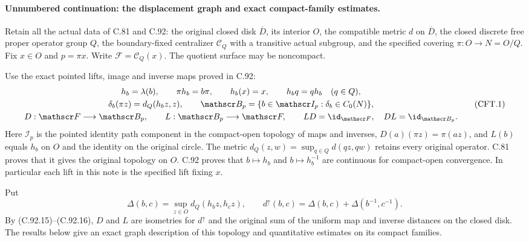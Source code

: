 \paragraph{Unnumbered continuation: the displacement graph and exact compact-family estimates.}
Retain all the actual data of C.81 and C.92: the original closed disk
$\overline D$, its interior $O$, the compatible metric $d$ on
$\overline D$, the closed discrete free proper operator group $Q$,
the boundary-fixed centralizer $\mathscr C_Q$ with a transitive actual
subgroup, and the specified covering $\pi:O\to N=O/Q$.
Fix $x\in O$ and $p=\pi x$. Write $\mathscr F=\mathscr C_Q(x)$.
The quotient surface may be noncompact.

Use the exact pointed lifts, image and inverse maps proved in C.92:
\[
\begin{gathered}
 h_b=\lambda(b),\qquad \pi h_b=b\pi,\qquad h_b(x)=x,
 \qquad h_bq=qh_b\quad(q\in Q),\\
 \delta_b(\pi z)=d_Q(h_bz,z),\qquad
 \mathscr B_p=\{b\in\mathscr I_p:\delta_b\in C_0(N)\},\\
 D:\mathscr F\longrightarrow\mathscr B_p,\qquad
 L:\mathscr B_p\longrightarrow\mathscr F,\qquad
 LD=\id_{\mathscr F},\quad DL=\id_{\mathscr B_p}.
\end{gathered}                                                  \tag{CFT.1}
\]
Here $\mathscr I_p$ is the pointed identity path component in the
compact-open topology of maps and inverses, $D(a)(\pi z)=\pi(az)$,
and $L(b)$ equals $h_b$ on $O$ and the identity on the original
circle. The metric $d_Q(z,w)=\sup_{q\in Q}d(qz,qw)$ retains every
original operator. C.81 proves that it gives the original topology
on $O$. C.92 proves that $b\mapsto h_b$ and $b\mapsto h_b^{-1}$
are continuous for compact-open convergence. In particular each
lift in this note is the specified lift fixing $x$.

Put
\[
 \Delta(b,c)=\sup_{z\in O}d_Q(h_bz,h_cz),\qquad
 d^\uparrow(b,c)=\Delta(b,c)+\Delta(b^{-1},c^{-1}).
                                                               \tag{CFT.2}
\]
By (C.92.15)--(C.92.16), $D$ and $L$ are isometries for
$d^\uparrow$ and the original sum of the uniform map and inverse
distances on the closed disk. The results below give an exact
graph description of this topology and quantitative estimates
on its compact families.

